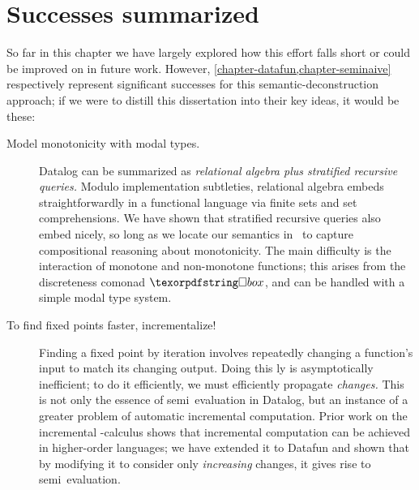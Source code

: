 


\section{Successes summarized}

So far in this chapter we have largely explored how this effort falls short or could be improved on in future work.
%
However, \cref{chapter-datafun,chapter-seminaive} respectively represent
significant successes for this semantic-deconstruction approach; if we were to
distill this dissertation into their key ideas, it would be these:


\begin{description}
\item[Model monotonicity with modal types.]
  Datalog can be summarized as \emph{relational algebra plus stratified
  recursive queries.} Modulo implementation subtleties, relational algebra
  embeds straightforwardly in a functional language via finite sets and set
  comprehensions. We have shown that stratified recursive queries also embed
  nicely, so long as we locate our semantics in \Poset\ to capture compositional
  reasoning about monotonicity.
  The main difficulty is the interaction of monotone and non-monotone functions;
  this arises from the discreteness comonad $\iso$, and can be handled with
  a simple modal type system.

\item[{To find fixed points faster, incrementalize!}] Finding a fixed point by
  iteration involves repeatedly changing a function's input to match its
  changing output. Doing this \naive{}ly is asymptotically inefficient; to do it
  efficiently, we must efficiently propagate \emph{changes.}
%
  This is not only the essence of semi\naive\ evaluation in Datalog, but an
  instance of a greater problem of automatic incremental computation.
%
  Prior work on the incremental \fn-calculus shows that incremental
  computation can be achieved in higher-order languages; we have extended it to
  Datafun and shown that by modifying it to consider only \emph{increasing}
  changes, it gives rise to semi\naive\ evaluation.

\end{description}
